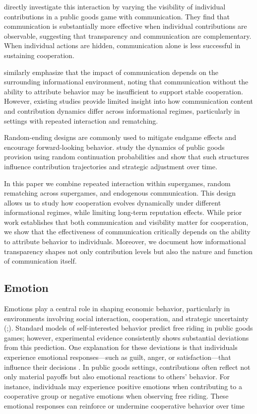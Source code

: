 \documentclass[12pt,letterpaper,english]{article}
\begin{document}
\cite{Haruvy2017_CommunicationVisibility} directly investigate this interaction by varying the visibility of individual contributions in a public goods game with communication. They find that communication is substantially more effective when individual contributions are observable, suggesting that transparency and communication are complementary. When individual actions are hidden, communication alone is less successful in sustaining cooperation.

\cite{Brandts2019_Communication} similarly emphasize that the impact of communication depends on the surrounding informational environment, noting that communication without the ability to attribute behavior may be insufficient to support stable cooperation. However, existing studies provide limited insight into how communication content and contribution dynamics differ across informational regimes, particularly in settings with repeated interaction and rematching.

Random-ending designs are commonly used to mitigate endgame effects and encourage forward-looking behavior. \cite{Isaac1988_Communication}study the dynamics of public goods provision using random continuation probabilities and show that such structures influence contribution trajectories and strategic adjustment over time. 

In this paper we combine repeated interaction within supergames, random rematching across supergames, and endogenous communication. This design allows us to study how cooperation evolves dynamically under different informational regimes, while limiting long-term reputation effects. While prior work establishes that both communication and visibility matter for cooperation, we show that the effectiveness of communication critically depends on the ability to attribute behavior to individuals. Moreover, we document how informational transparency shapes not only contribution levels but also the nature and function of communication itself.

\subsection{Emotion}

Emotions play a central role in shaping economic behavior, particularly in environments involving social interaction, cooperation, and strategic uncertainty (\cite{Loewenstein2000};\cite{Elster1998}). Standard models of self-interested behavior predict free riding in public goods games; however, experimental evidence consistently shows substantial deviations from this prediction. One explanation for these deviations is that individuals experience emotional responses—such as guilt, anger, or satisfaction—that influence their decisions \cite{Battigalli2007}. In public goods settings, contributions often reflect not only material payoffs but also emotional reactions to others’ behavior. For instance, individuals may experience positive emotions when contributing to a cooperative group or negative emotions when observing free riding. These emotional responses can reinforce or undermine cooperative behavior over time \cite{Fehr2002}
\end{document}
